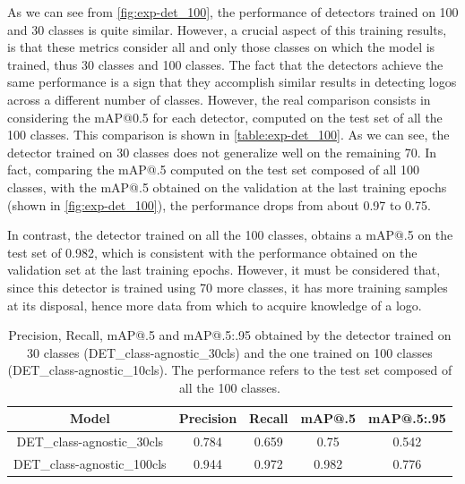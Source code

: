 As we can see from \autoref{fig:exp-det_100}, the performance of detectors trained on 100 and 30 classes is quite similar.
However, a crucial aspect of this training results, is that these metrics consider all and only those classes on which the model is trained, thus 30 classes and 100 classes.
The fact that the detectors achieve the same performance is a sign that they accomplish similar results in detecting logos across a different number of classes.
However, the real comparison consists in considering the mAP@0.5 for each detector, computed on the test set of all the 100 classes. This comparison is shown in \autoref{table:exp-det_100}. As we can see, the detector trained on 30 classes does not generalize well on the remaining 70.
In fact, comparing the mAP@.5 computed on the test set composed of all 100 classes, with the mAP@.5 obtained on the validation at the last training epochs (shown in \autoref{fig:exp-det_100}), the performance drops from about 0.97 to 0.75.

In contrast, the detector trained on all the 100 classes, obtains a mAP@.5 on the test set of 0.982, which is consistent with the performance obtained on the validation set at the last training epochs.
However, it must be considered that, since this detector is trained using 70 more classes, it has more training samples at its disposal, hence more data from which to acquire knowledge of a logo.


\begin{table}[H]
    \centering
    \begin{tabular}{c|c|c|c|c}
        \hline
        \textbf{Model} &
        \textbf{Precision} &
        \textbf{Recall} &
        \textbf{mAP@.5} &
        \textbf{mAP@.5:.95} \\
        \hline
        \hline
DET\_class-agnostic\_30cls&0.784&0.659&0.75&0.542\\
DET\_class-agnostic\_100cls&0.944&0.972&0.982&0.776\\
\hline
\end{tabular}
\caption{Precision, Recall, mAP@.5 and mAP@.5:.95 obtained by the detector trained on 30 classes (DET\_class-agnostic\_30cls) and the one trained on 100 classes (DET\_class-agnostic\_10cls). The performance refers to the test set composed of all the 100 classes.}
    \label{table:exp-det_100}
\end{table}

